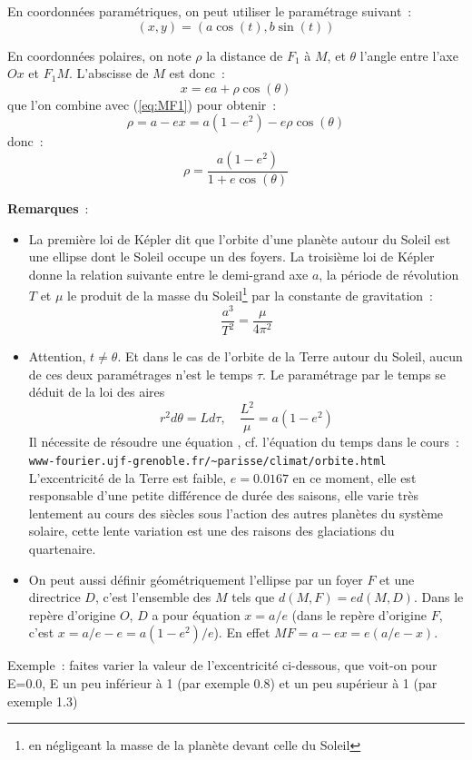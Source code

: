 \documentclass[a4paper,11pt]{article}
\begin{document}
\begin{giacjshere}
En coordonn\'ees param\'etriques, on peut utiliser le param\'etrage suivant~:
$$ (x,y)=(a\cos(t),b\sin(t))$$

En coordonn\'ees polaires, on note $\rho$ la distance de $F_1$ \`a
$M$, et $\theta$ l'angle entre l'axe $Ox$ et $F_1M$. L'abscisse de $M$
est donc~:
\[ x= ea + \rho \cos(\theta)\]
que l'on combine avec (\ref{eq:MF1}) pour obtenir~:
\[ \rho = a-ex =a(1-e^2) - e \rho \cos(\theta) \]
donc~:
\[ \rho = \frac{a(1-e^2)}{1+e\cos(\theta)} \]

{\bf Remarques}~:
\begin{itemize}
\item La premi\`ere loi de K\'epler dit que l'orbite d'une plan\`ete
autour du Soleil est une ellipse dont le Soleil occupe un des foyers.
La troisi\`eme loi de K\'epler donne la relation suivante entre le
demi-grand axe $a$, la p\'eriode de r\'evolution $T$ et $\mu$
le produit de la masse du Soleil\footnote{en n\'egligeant la masse
de la plan\`ete devant celle du Soleil} par la constante de gravitation~:
$$ \frac{a^3}{T^2} = \frac{\mu}{4\pi^2}$$
\item Attention, $t\neq \theta$. Et dans le cas de l'orbite
de la Terre autour du Soleil, aucun de ces deux param\'etrages n'est
le temps $\tau$. Le param\'etrage par le temps se d\'eduit de la loi
des aires
\[ r^2 d\theta =  L d\tau , \quad
 \frac{L^2}{\mu}= a(1-e^2) \]
Il n\'ecessite de r\'esoudre
une \'equation , cf. l'\'equation du temps dans le cours~:\\
\verb|www-fourier.ujf-grenoble.fr/~parisse/climat/orbite.html|\\
L'excentricit\'e de la Terre est faible, $e=0.0167$ en
ce moment, elle est responsable d'une petite diff\'erence 
de dur\'ee des saisons, elle varie tr\`es lentement au cours des si\`ecles sous
l'action des autres plan\`etes du syst\`eme solaire, cette lente variation
est une des raisons des glaciations du quartenaire.
\item On peut aussi d\'efinir g\'eom\'etriquement l'ellipse
par un foyer $F$ et une directrice $D$, c'est l'ensemble des $M$ tels
que $d(M,F)=ed(M,D)$. Dans le rep\`ere d'origine $O$, $D$
a pour \'equation $x=a/e$ (dans le rep\`ere d'origine $F$, c'est
$x=a/e-e=a(1-e^2)/e$). En effet $MF=a-ex=e(a/e-x)$.
\end{itemize}
Exemple~: faites varier la valeur de l'excentricit\'e ci-dessous, que
voit-on pour E=0.0, E un peu inf\'erieur \`a 1 (par exemple 0.8) et un peu sup\'erieur
\`a 1 (par exemple 1.3)\\


\end{giacjshere}
\end{document}
